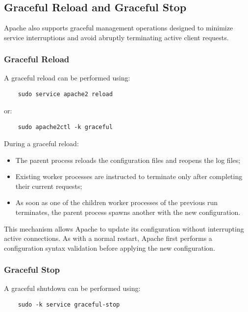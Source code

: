 \documentclass{scrbook}
\begin{document}
	\subsection{Graceful Reload and Graceful Stop}
	
	Apache also supports graceful management operations designed to minimize service interruptions and avoid abruptly terminating active client requests.
	
	\subsubsection{Graceful Reload}
	
	A graceful reload can be performed using:
	
	\begin{lstlisting}
	sudo service apache2 reload
	\end{lstlisting}
	
	or:
	
	\begin{lstlisting}
	sudo apache2ctl -k graceful
	\end{lstlisting}
	
	During a graceful reload:
	\begin{itemize}
		\item The parent process reloads the configuration files and reopens the log files;
		
		\item Existing worker processes are instructed to terminate only after completing their current requests;
		
		\item As soon as one of the children worker processes of the previous run terminates, the parent process spawns another with the new configuration. 
	\end{itemize}
	
	This mechanism allows Apache to update its configuration without interrupting active connections. As with a normal restart, Apache first performs a configuration syntax validation before applying the new configuration.
	
	\subsubsection{Graceful Stop}
	
	A graceful shutdown can be performed using:
	
	\begin{lstlisting}
	sudo -k service graceful-stop
	\end{lstlisting}
	
\end{document}
